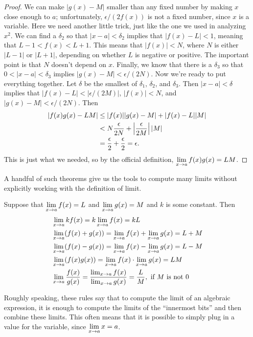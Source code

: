 \begin{proof}
We can make $|g(x)-M|$ smaller than any fixed number by making $x$
close enough to $a$; unfortunately, $\epsilon/(2f(x))$ is not a fixed
number, since $x$ is a variable. Here we need another little trick,
just like the one we used in analyzing $x^2$. We can find a $\delta_2$
so that $|x-a|<\delta_2$ implies that $|f(x)-L|<1$, meaning that $L-1
< f(x) < L+1$. This means that $|f(x)|<N$, where $N$ is either $|L-1|$
or $|L+1|$, depending on whether $L$ is negative or positive. The
important point is that $N$ doesn't depend on $x$. Finally, we know that
there is a $\delta_3$ so that $0<|x-a|<\delta_3$ implies
$|g(x)-M|<\epsilon/(2N)$. Now we're ready to put everything
together. Let $\delta$ be the smallest of $\delta_1$, $\delta_2$, and
$\delta_3$. Then $|x-a|<\delta$ implies that
$|f(x)-L|<|\epsilon/(2M)|$, $|f(x)|<N$, and
$|g(x)-M|<\epsilon/(2N)$. Then 
\begin{align*}
|f(x)g(x)-LM|&\le|f(x)||g(x)-M|+|f(x)-L||M| \\
&<N{\epsilon\over 2N}+\left|{\epsilon\over 2M}\right||M| \\
&={\epsilon\over 2}+{\epsilon\over 2}=\epsilon.
\end{align*}
This is just what we needed, so by the official definition,
$\displaystyle \lim_{x\to a}f(x)g(x)=LM$.
\end{proof}

A handful of such theorems give us the tools to compute many limits
without explicitly working with the definition of limit.

\begin{theorem} Suppose that $\displaystyle \lim_{x\to a}f(x)=L$ and $\displaystyle \lim_{x\to a}g(x)=M$ and
$k$ is some constant. Then
\begin{align*}
&\lim_{x\to a} kf(x) = k\lim_{x\to a}f(x)=kL \\
&\lim_{x\to a} (f(x)+g(x)) = \lim_{x\to a}f(x)+\lim_{x\to a}g(x)=L+M \\
&\lim_{x\to a} (f(x)-g(x)) = \lim_{x\to a}f(x)-\lim_{x\to a}g(x)=L-M \\
&\lim_{x\to a} (f(x)g(x)) = \lim_{x\to a}f(x)\cdot\lim_{x\to a}g(x)=LM \\
&\lim_{x\to a} {f(x)\over g(x)} = {\lim_{x\to a}f(x)\over\lim_{x\to
    a}g(x)}={L\over M},\hbox{ if $M$ is not 0}
\end{align*}
\label{thm:properties of limits}
\end{theorem}

Roughly speaking, these rules say that to compute the limit of an
algebraic expression, it is enough to compute the limits of the
``innermost bits'' and then combine these limits. This often means
that it is possible to simply plug in a value for the variable, since
$\displaystyle \lim_{x\to a} x =a$.

